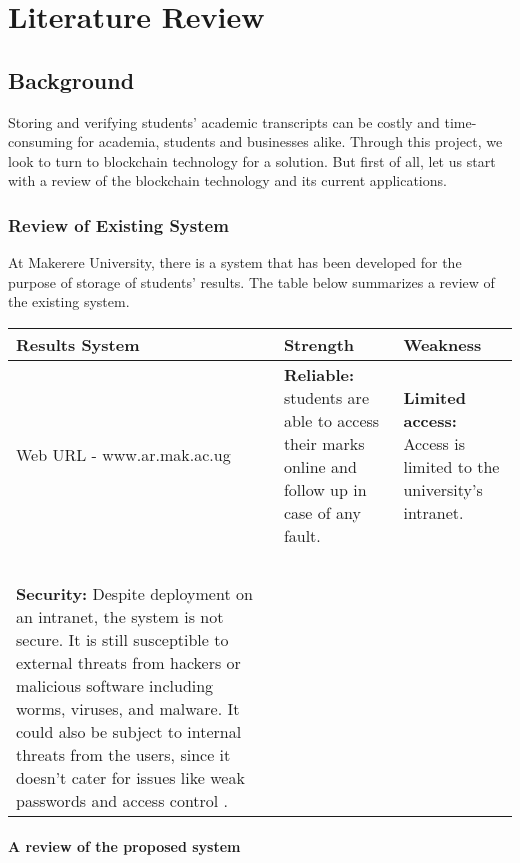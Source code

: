 \chapter{Literature Review}

\section{Background}

Storing and verifying students' academic transcripts can be costly and time-consuming for academia, students and businesses alike. Through this project, we look to turn to blockchain technology for a solution. But first of all, let us start with a review of the blockchain technology and its current applications.\\

\subsection{Review of Existing System}
At Makerere University, there is a system that has been developed for the purpose of storage of students’ results. The table below summarizes a review of the existing system.

\begin{tabular}{|p{3cm}|p{4cm}|p{7cm}|}
\hline
Results System&Strength&Weakness\\
\hline
\hline
Web URL - www.ar.mak.ac.ug& \textbf{Reliable:} students are able to access their marks online and follow up in case of any fault.& \textbf{Limited access:} Access is limited to the university’s intranet. \\~\\

\textbf{Security:} Despite deployment on an intranet, the system is not secure. It is still susceptible to external threats from hackers or malicious software including worms, viruses, and malware. It could also be subject to internal threats from the users, since it doesn’t cater for issues like weak passwords and access control \cite{art3}.
\\ 
\hline

\end{tabular}

\subsubsection{A review of the proposed system}

